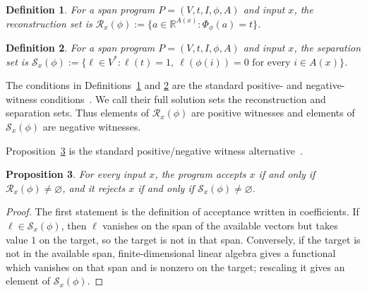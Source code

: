 \documentclass[11pt]{article}
\numberwithin{equation}{section}
\newtheorem{definition}{Definition}[section]
\newtheorem{proposition}[definition]{Proposition}
\theoremstyle{remark}
\begin{document}
\begin{definition}
\label{def:reconstruction-set}
For a span program $P=(V,t,I,\phi,A)$ and input $x$, the \emph{reconstruction set} is $\mathcal R_x(\phi):=\{a\in\mathbb R^{A(x)}:\Phi_\phi(a)=t\}$.
\end{definition}

\begin{definition}
\label{def:separation-set}
For a span program $P=(V,t,I,\phi,A)$ and input $x$, the \emph{separation set} is $\mathcal S_x(\phi):=\{\ell\in V^*:\ell(t)=1,\ \ell(\phi(i))=0\text{ for every }i\in A(x)\}$.
\end{definition}

The conditions in Definitions~\ref{def:reconstruction-set} and
\ref{def:separation-set} are the standard positive- and negative-witness
conditions~\cite{ReichardtSpalek2008,Reichardt2009}. We call their full
solution sets the reconstruction and separation sets. Thus elements of
$\mathcal R_x(\phi)$ are positive witnesses and elements of
$\mathcal S_x(\phi)$ are negative witnesses.

Proposition~\ref{prop:reconstruction-separation-acceptance} is the standard
positive/negative witness alternative~\cite{Reichardt2009}.

\begin{proposition}
\label{prop:reconstruction-separation-acceptance}
For every input $x$, the program accepts $x$ if and only if $\mathcal R_x(\phi)\neq\varnothing$, and it rejects $x$ if and only if $\mathcal S_x(\phi)\neq\varnothing$.
\end{proposition}

\begin{proof}
The first statement is the definition of acceptance written in coefficients. If $\ell\in\mathcal S_x(\phi)$, then $\ell$ vanishes on the span of the available vectors but takes value $1$ on the target, so the target is not in that span. Conversely, if the target is not in the available span, finite-dimensional linear algebra gives a functional which vanishes on that span and is nonzero on the target; rescaling it gives an element of $\mathcal S_x(\phi)$.
\end{proof}
\end{document}

